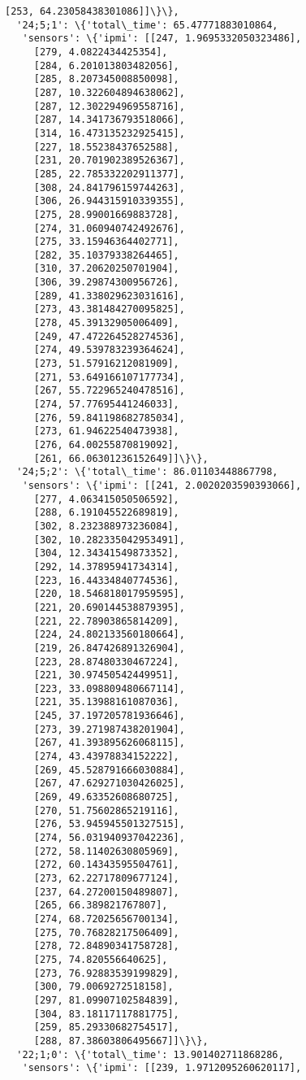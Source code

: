 \documentclass[11pt]{article}
\begin{document}
\begin{tcolorbox}[breakable, size=fbox, boxrule=.5pt, pad at break*=1mm, opacityfill=0]
\begin{Verbatim}[commandchars=\\\{\}]
     [253, 64.23058438301086]]\}\},
  '24;5;1': \{'total\_time': 65.47771883010864,
   'sensors': \{'ipmi': [[247, 1.9695332050323486],
     [279, 4.0822434425354],
     [284, 6.201013803482056],
     [285, 8.207345008850098],
     [287, 10.322604894638062],
     [287, 12.302294969558716],
     [287, 14.341736793518066],
     [314, 16.473135232925415],
     [227, 18.55238437652588],
     [231, 20.701902389526367],
     [285, 22.785332202911377],
     [308, 24.841796159744263],
     [306, 26.944315910339355],
     [275, 28.99001669883728],
     [274, 31.060940742492676],
     [275, 33.15946364402771],
     [282, 35.10379338264465],
     [310, 37.20620250701904],
     [306, 39.29874300956726],
     [289, 41.338029623031616],
     [273, 43.381484270095825],
     [278, 45.39132905006409],
     [249, 47.472264528274536],
     [274, 49.539783239364624],
     [273, 51.57916212081909],
     [271, 53.649166107177734],
     [267, 55.722965240478516],
     [274, 57.77695441246033],
     [276, 59.841198682785034],
     [273, 61.94622540473938],
     [276, 64.00255870819092],
     [261, 66.06301236152649]]\}\},
  '24;5;2': \{'total\_time': 86.01103448867798,
   'sensors': \{'ipmi': [[241, 2.0020203590393066],
     [277, 4.063415050506592],
     [288, 6.191045522689819],
     [302, 8.232388973236084],
     [302, 10.282335042953491],
     [304, 12.34341549873352],
     [292, 14.37895941734314],
     [223, 16.44334840774536],
     [220, 18.546818017959595],
     [221, 20.690144538879395],
     [221, 22.78903865814209],
     [224, 24.802133560180664],
     [219, 26.847426891326904],
     [223, 28.87480330467224],
     [221, 30.97450542449951],
     [223, 33.098809480667114],
     [221, 35.13988161087036],
     [245, 37.197205781936646],
     [273, 39.271987438201904],
     [267, 41.393895626068115],
     [274, 43.43978834152222],
     [269, 45.528791666030884],
     [267, 47.629271030426025],
     [269, 49.63352608680725],
     [270, 51.75602865219116],
     [276, 53.945945501327515],
     [274, 56.031940937042236],
     [272, 58.11402630805969],
     [272, 60.14343595504761],
     [273, 62.22717809677124],
     [237, 64.27200150489807],
     [265, 66.389821767807],
     [274, 68.72025656700134],
     [275, 70.76828217506409],
     [278, 72.84890341758728],
     [275, 74.820556640625],
     [273, 76.92883539199829],
     [300, 79.0069272518158],
     [297, 81.09907102584839],
     [304, 83.18117117881775],
     [259, 85.29330682754517],
     [288, 87.38603806495667]]\}\},
  '22;1;0': \{'total\_time': 13.901402711868286,
   'sensors': \{'ipmi': [[239, 1.9712095260620117],

\end{Verbatim}
\end{tcolorbox}
\end{document}
